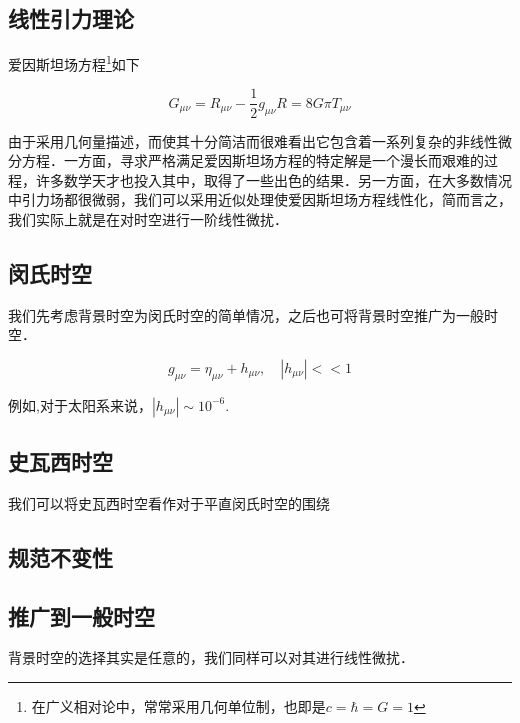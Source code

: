 
\begin{issues}
\issueMissDepend
\issueDraft
\end{issues}



\subsection{线性引力理论}
爱因斯坦场方程\footnote{在广义相对论中，常常采用几何单位制，也即是$c=\hbar=G=1$}如下

\begin{equation}
G_{\mu \nu} = R_{\mu \nu} - \frac{1}{2}g_{\mu\nu}R = 8 G\pi T_{\mu\nu}
\end{equation}

由于采用几何量描述，而使其十分简洁而很难看出它包含着一系列复杂的非线性微分方程．一方面，寻求严格满足爱因斯坦场方程的特定解是一个漫长而艰难的过程，许多数学天才也投入其中，取得了一些出色的结果．另一方面，在大多数情况中引力场都很微弱，我们可以采用近似处理使爱因斯坦场方程线性化，简而言之，我们实际上就是在对时空进行一阶线性微扰．

\subsection{闵氏时空}

我们先考虑背景时空为闵氏时空的简单情况，之后也可将背景时空推广为一般时空．

\begin{equation}
g_{\mu\nu} = \eta_{\mu\nu} + h_{\mu\nu},\quad |h_{\mu\nu}|<<1
\end{equation}

例如,对于太阳系来说，$|h_{\mu\nu}| \sim 10^{-6}$.


\subsection{史瓦西时空}

我们可以将史瓦西时空看作对于平直闵氏时空的围绕


\subsection{规范不变性}


\subsection{推广到一般时空}

背景时空的选择其实是任意的，我们同样可以对其进行线性微扰．

